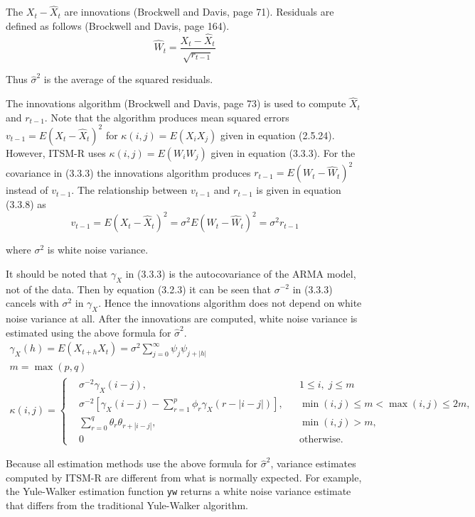 \documentclass[12pt]{article}
\begin{document}
The $X_t-\hat X_t$ are innovations (Brockwell and Davis, page 71).
Residuals are defined as follows (Brockwell and Davis, page 164).
\[
\hat W_t=\frac{X_t-\hat X_t}{\sqrt{r_{t-1}}}
\]

Thus $\hat\sigma^2$ is the average of the squared residuals.

\bigskip
The innovations algorithm (Brockwell and Davis, page 73)
is used to compute $\hat X_t$ and $r_{t-1}$.
Note that the algorithm produces mean squared errors
$v_{t-1}=E(X_t-\hat X_t)^2$ for $\kappa(i,j)=E(X_iX_j)$
given in equation (2.5.24).
However, ITSM-R uses $\kappa(i,j)=E(W_iW_j)$ given in
equation (3.3.3).
For the covariance in (3.3.3)
the innovations algorithm produces $r_{t-1}=E(W_t-\hat W_t)^2$
instead of $v_{t-1}$.
The relationship between $v_{t-1}$ and $r_{t-1}$ is given in
equation (3.3.8) as
\[
v_{t-1}=E(X_t-\hat X_t)^2=\sigma^2E(W_t-\hat W_t)^2=\sigma^2r_{t-1}
\]

where $\sigma^2$ is white noise variance.

\bigskip
It should be noted that $\gamma_X$ in (3.3.3) is
the autocovariance of the ARMA model, not of the data.
Then by equation (3.2.3) it can be seen that $\sigma^{-2}$ in (3.3.3)
cancels with $\sigma^2$ in $\gamma_X$.
Hence the innovations algorithm does not depend on white noise variance at all.
After the innovations are computed, white noise variance is estimated
using the above formula for $\hat\sigma^2$.
\begin{gather*}
\gamma_X(h)=E(X_{t+h}X_t)=\sigma^2\sum_{j=0}^\infty\psi_j\psi_{j+|h|}\tag{3.2.3}
\\
m=\max(p,q)\tag{3.3.2}
\\
\kappa(i,j)=\left\{
\begin{aligned}
&\sigma^{-2}\gamma_X(i-j), && 1\le i,\;j\le m\\
&\sigma^{-2}\left[
\gamma_X(i-j)-\sum_{r=1}^p\phi_r\gamma_X(r-|i-j|)\right],
&& \min(i,j)\le m<\max(i,j)\le2m,\\
&\sum_{r=0}^q\theta_r\theta_{r+|i-j|},&&\min(i,j)>m,\\
&0&&\text{otherwise.}
\end{aligned}
\right.\tag{3.3.3}
\end{gather*}

Because all estimation methods use the above formula for $\hat\sigma^2$,
variance estimates computed by ITSM-R are different from what is normally
expected.
For example, the Yule-Walker estimation function {\tt yw} returns a white noise
variance estimate that differs from the traditional Yule-Walker algorithm.
\end{document}

